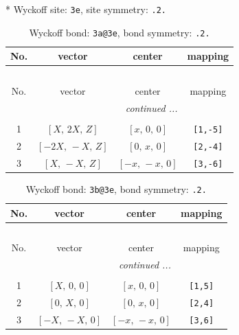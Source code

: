\documentclass[fleqn,8pt]{jsarticle}
\begin{document}
* Wyckoff site: {\tt 3e}, site symmetry: {\tt .2.}
\renewcommand{\arraystretch}{1.2}
\begin{longtable}{cccc}
\caption{Wyckoff bond: {\tt 3a@3e}, bond symmetry: {\tt .2.}}
 \\
 \hline \hline
No. & vector & center & mapping \\ \hline \endfirsthead

\multicolumn{3}{l}{\tablename\ \thetable{}} \\
 \hline \hline
No. & vector & center & mapping \\ \hline \endhead

 \hline \hline
\multicolumn{3}{r}{\footnotesize\it continued ...} \\ \endfoot

 \hline \hline
\multicolumn{3}{r}{} \\ \endlastfoot

1 & $\left[ X,\, 2 X,\, Z \right]$ & $\left[ x,\, 0,\, 0 \right]$ & {\tt [1,-5]} \\ \hline
2 & $\left[ - 2 X,\, - X,\, Z \right]$ & $\left[ 0,\, x,\, 0 \right]$ & {\tt [2,-4]} \\ \hline
3 & $\left[ X,\, - X,\, Z \right]$ & $\left[ - x,\, - x,\, 0 \right]$ & {\tt [3,-6]} \\
\end{longtable}
\renewcommand{\arraystretch}{1.2}
\begin{longtable}{cccc}
\caption{Wyckoff bond: {\tt 3b@3e}, bond symmetry: {\tt .2.}}
 \\
 \hline \hline
No. & vector & center & mapping \\ \hline \endfirsthead

\multicolumn{3}{l}{\tablename\ \thetable{}} \\
 \hline \hline
No. & vector & center & mapping \\ \hline \endhead

 \hline \hline
\multicolumn{3}{r}{\footnotesize\it continued ...} \\ \endfoot

 \hline \hline
\multicolumn{3}{r}{} \\ \endlastfoot

1 & $\left[ X,\, 0,\, 0 \right]$ & $\left[ x,\, 0,\, 0 \right]$ & {\tt [1,5]} \\ \hline
2 & $\left[ 0,\, X,\, 0 \right]$ & $\left[ 0,\, x,\, 0 \right]$ & {\tt [2,4]} \\ \hline
3 & $\left[ - X,\, - X,\, 0 \right]$ & $\left[ - x,\, - x,\, 0 \right]$ & {\tt [3,6]} \\
\end{longtable}
\end{document}
